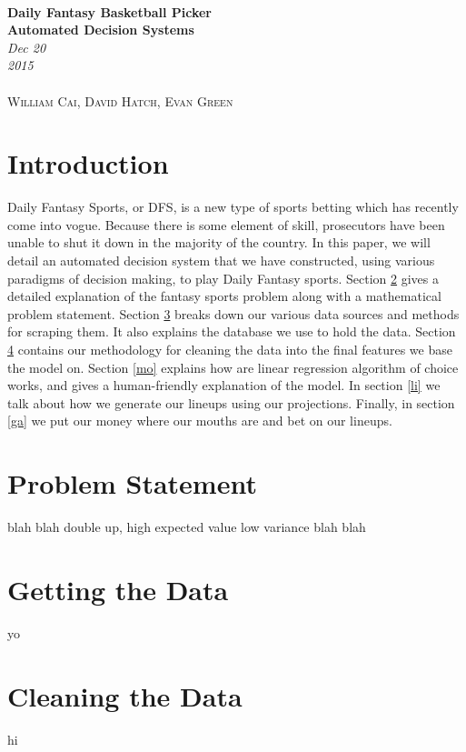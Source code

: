 \documentclass[12pt]{article}
\renewcommand{\=}[1]{\stackrel{#1}{=}} %
\theoremstyle{definition}
\begin{document}
{\noindent\Huge\bf  \\[0.5\baselineskip] {\selectfont Daily Fantasy Basketball Picker}         }\\[2\baselineskip] %
{ {\bf {}\selectfont Automated Decision Systems}\\ {\textit{\selectfont     Dec 20 2015}}}~~~~~~~~~~~~~~~~~~~~~~~~~~~~~~~~~~~~~~~~~~~~~~~~~~~~~~~~~~~~~~~~~~~~~~~~~~~~~\
{\large \textsc{ \\William Cai, David Hatch, Evan Green}} %
\\[1.4\baselineskip] 
\section{Introduction} 
\label{in}

Daily Fantasy Sports, or DFS, is a new type of sports betting which has recently come into vogue.  Because there is some element of skill, prosecutors have been unable to shut it down in the majority of the country.  In this paper, we will detail an automated decision system that we have constructed, using various paradigms of decision making, to play Daily Fantasy sports.  Section \ref{ps} gives a detailed explanation of the fantasy sports problem along with a mathematical problem statement.  Section \ref{da} breaks down our various data sources and methods for scraping them.  It also explains the database we use to hold the data.  Section \ref{cl} contains our methodology for cleaning the data into the final features we base the model on.  Section \ref{mo} explains how are linear regression algorithm of choice works, and gives a human-friendly explanation of the model. In section \ref{li} we talk about how we generate our lineups using our projections.  Finally, in section \ref{ga} we put our money where our mouths are and bet on our lineups.  

\section{Problem Statement} 
\label{ps}
blah blah double up, high expected value low variance blah blah

\section{Getting the Data} 
\label{da}
yo

\section{Cleaning the Data} 
\label{cl}
hi
\end{document}

